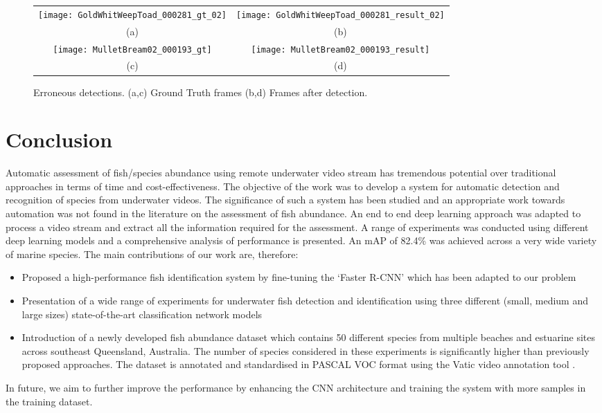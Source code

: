 \documentclass[conference]{IEEEtran}       %
\begin{document}
\begin{figure*}[!htb]
   \centering
   \begin{tabular}{cc}
        \texttt{[image: GoldWhitWeepToad\_000281\_gt\_02]}&
        \texttt{[image: GoldWhitWeepToad\_000281\_result\_02]}\\
        (a) & (b)\\
        \texttt{[image: MulletBream02\_000193\_gt]}&
        \texttt{[image: MulletBream02\_000193\_result]}\\
        (c) & (d)\\
   \end{tabular}  \vspace{-1ex}
   \caption{Erroneous detections. (a,c) Ground Truth frames (b,d) Frames after detection.}
\label{fig:FramedetectionError}
\vspace{-3ex}
\end{figure*}
\section{Conclusion}
\label{conclusion}
Automatic assessment of fish/species abundance using remote underwater video stream has tremendous potential over traditional approaches in terms of time and cost-effectiveness. The objective of the work was to develop a system for automatic detection and recognition of species from underwater videos. The significance of such a system has been studied and an appropriate work towards automation was not found in the literature on the assessment of fish abundance. An end to end deep learning approach was adapted to process a video stream and extract all the information required for the assessment. A range of experiments was conducted using different deep learning models and a comprehensive analysis of performance is presented. An mAP of 82.4\% was achieved across a very wide variety of marine species.
The main contributions of our work are, therefore:
\begin{itemize}
\item Proposed a high-performance fish identification system by fine-tuning the `Faster R-CNN' which has been adapted to our problem 
\item Presentation of a wide range of experiments for underwater fish detection and identification using three different (small, medium and large sizes) state-of-the-art classification network models
\item Introduction of a newly developed fish abundance dataset which contains 50 different species from multiple beaches and estuarine sites across southeast Queensland, Australia. The number of species considered in these experiments is significantly higher than previously proposed approaches. The dataset is annotated and standardised in PASCAL VOC \cite{Everingham15} format using the Vatic video annotation tool \cite{springerlink:10.1007/s11263-012-0564-1}.
\end{itemize}
In future, we aim to further improve the performance by enhancing the CNN architecture and training the system with more samples in the training dataset.
\end{document}
